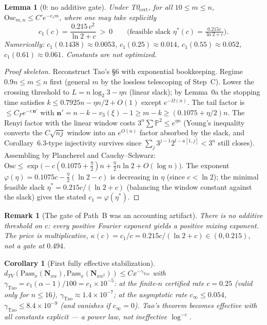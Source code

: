 \documentclass[12pt,a4paper]{article}
\newtheorem{lemma}[theorem]{Lemma}
\newtheorem{corollary}[theorem]{Corollary}
\newtheorem{remark}[theorem]{Remark}
\begin{document}
\begin{lemma}[0: no additive gate]
Under T0$_{\mathrm{cert}}$, for all $10\le m\le n$,
$\mathrm{Osc}_{m,n}\le C'e^{-c_1m}$, where one may take explicitly
\[
c_1(c)=\frac{0.215\,c^2}{\ln2+c}\ >\ 0
\qquad\big(\text{feasible slack }\eta^*(c)=\tfrac{0.215c}{\ln2+c}\big).
\]
Numerically: $c_1(0.1438)\approx0.0053$, $c_1(0.25)\approx0.014$,
$c_1(0.55)\approx0.052$, $c_1(0.61)\approx0.061$. Constants are not optimized.
\end{lemma}
\begin{proof}[Proof skeleton]
Reconstruct Tao's \S6 with exponential bookkeeping. Regime $0.9n\le m\le n$
first (general $m$ by the lossless telescoping of Step~C). Lower the crossing
threshold to $L=n\log_2 3-\eta n$ (linear slack); by Lemma~0a the stopping time
satisfies $k\le0.7925n-\eta n/2+O(1)$ except $e^{-\Omega(n)}$. The tail factor
is $\le C_Fe^{-c\,\mathbf n'}$ with
$\mathbf n'=n-k-v_3(\xi)-1\ge m-k\ge(0.1075+\eta/2)n$. The Renyi factor with
the linear window costs $3^n\sum\mathbb P^2\le e^{\eta n}$ (Young's inequality
converts the $C\sqrt{nj}$ window into an $e^{O(n)}$ factor absorbed by the
slack, and Corollary~6.3-type injectivity survives since
$\sum_j3^{j-1}2^{l-a[1,j]}<3^n$ still closes). Assembling by Plancherel and
Cauchy--Schwarz:
$\mathrm{Osc}\le\exp\big(-c(0.1075+\tfrac\eta2)n+\tfrac\eta2n\ln2+O(\log n)\big)$.
The exponent $\varphi(\eta)=0.1075c-\tfrac\eta2(\ln2-c)$ is decreasing in
$\eta$ (since $c<\ln2$); the minimal feasible slack
$\eta^*=0.215c/(\ln2+c)$ (balancing the window constant against the slack)
gives the stated $c_1=\varphi(\eta^*)$.
\end{proof}

\begin{remark}[The gate of Path~B was an accounting artifact]
There is no additive threshold on $c$: every positive Fourier exponent yields
a positive mixing exponent. The price is multiplicative,
$\kappa(c)=c_1/c=0.215c/(\ln2+c)\in(0,0.215)$, not a gate at $0.494$.
\end{remark}

\begin{corollary}[First fully effective stabilization]
$d_{TV}(\mathrm{Pass}_x(\mathbf N_{x\alpha}),\mathrm{Pass}_x(\mathbf N_{x\alpha^2}))
\le Cx^{-\gamma_{\mathrm{Tao}}}$ with
$\gamma_{\mathrm{Tao}}=c_1(\alpha-1)/100=c_1\times10^{-5}$:
at the finite-$n$ certified rate $c=0.25$ (valid only for $n\le16$), $\gamma_{\mathrm{Tao}}\approx1.4\times10^{-7}$;
at the asymptotic rate $c_\infty \le 0.054$, $\gamma_{\mathrm{Tao}} \le 8.4\times10^{-9}$ (and vanishes if $c_\infty=0$).
Tao's theorem becomes
effective with all constants explicit --- a power law, not ineffective
$\log^{-c}$.
\end{corollary}
\end{document}

